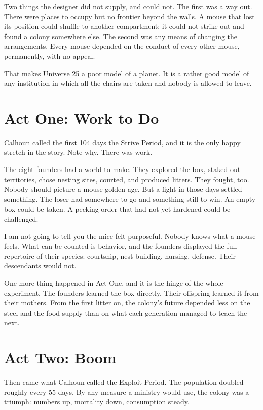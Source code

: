 \documentclass[12pt,a4paper]{book}
\begin{document}
Two things the designer did not supply, and could not. The first was a way out. There were places to occupy but no frontier beyond the walls. A mouse that lost its position could shuffle to another compartment; it could not strike out and found a colony somewhere else. The second was any means of changing the arrangements. Every mouse depended on the conduct of every other mouse, permanently, with no appeal.

That makes Universe 25 a poor model of a planet. It is a rather good model of any institution in which all the chairs are taken and nobody is allowed to leave.

\section{Act One: Work to Do}

Calhoun called the first 104 days the Strive Period, and it is the only happy stretch in the story. Note why. There was work.

The eight founders had a world to make. They explored the box, staked out territories, chose nesting sites, courted, and produced litters. They fought, too. Nobody should picture a mouse golden age. But a fight in those days settled something. The loser had somewhere to go and something still to win. An empty box could be taken. A pecking order that had not yet hardened could be challenged.

I am not going to tell you the mice felt purposeful. Nobody knows what a mouse feels. What can be counted is behavior, and the founders displayed the full repertoire of their species: courtship, nest-building, nursing, defense. Their descendants would not.

One more thing happened in Act One, and it is the hinge of the whole experiment. The founders learned the box directly. Their offspring learned it from their mothers. From the first litter on, the colony's future depended less on the steel and the food supply than on what each generation managed to teach the next.

\section{Act Two: Boom}

Then came what Calhoun called the Exploit Period. The population doubled roughly every 55 days. By any measure a ministry would use, the colony was a triumph: numbers up, mortality down, consumption steady.
\end{document}
